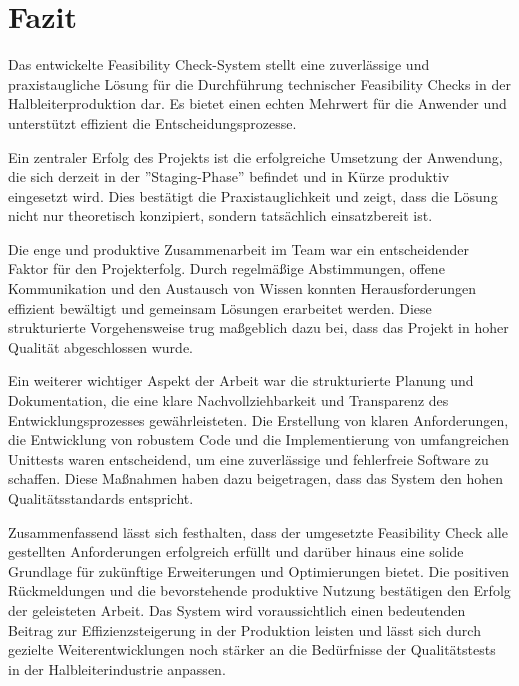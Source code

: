 \chapter{Fazit}

Das entwickelte Feasibility Check-System stellt eine zuverlässige und praxistaugliche Lösung für die Durchführung technischer Feasibility Checks in der Halbleiterproduktion dar. Es bietet einen echten Mehrwert für die Anwender und unterstützt effizient die Entscheidungsprozesse.

Ein zentraler Erfolg des Projekts ist die erfolgreiche Umsetzung der Anwendung, die sich derzeit in der ''Staging-Phase'' befindet und in Kürze produktiv eingesetzt wird. Dies bestätigt die Praxistauglichkeit und zeigt, dass die Lösung nicht nur theoretisch konzipiert, sondern tatsächlich einsatzbereit ist.

Die enge und produktive Zusammenarbeit im Team war ein entscheidender Faktor für den Projekterfolg. Durch regelmäßige Abstimmungen, offene Kommunikation und den Austausch von Wissen konnten Herausforderungen effizient bewältigt und gemeinsam Lösungen erarbeitet werden. Diese strukturierte Vorgehensweise trug maßgeblich dazu bei, dass das Projekt in hoher Qualität abgeschlossen wurde.

Ein weiterer wichtiger Aspekt der Arbeit war die strukturierte Planung und Dokumentation, die eine klare Nachvollziehbarkeit und Transparenz des Entwicklungsprozesses gewährleisteten. Die Erstellung von klaren Anforderungen, die Entwicklung von robustem Code und die Implementierung von umfangreichen Unittests waren entscheidend, um eine zuverlässige und fehlerfreie Software zu schaffen. Diese Maßnahmen haben dazu beigetragen, dass das System den hohen Qualitätsstandards entspricht.

Zusammenfassend lässt sich festhalten, dass der umgesetzte Feasibility Check alle gestellten Anforderungen erfolgreich erfüllt und darüber hinaus eine solide Grundlage für zukünftige Erweiterungen und Optimierungen bietet. Die positiven Rückmeldungen und die bevorstehende produktive Nutzung bestätigen den Erfolg der geleisteten Arbeit. Das System wird voraussichtlich einen bedeutenden Beitrag zur Effizienzsteigerung in der Produktion leisten und lässt sich durch gezielte Weiterentwicklungen noch stärker an die Bedürfnisse der Qualitätstests in der Halbleiterindustrie anpassen.





